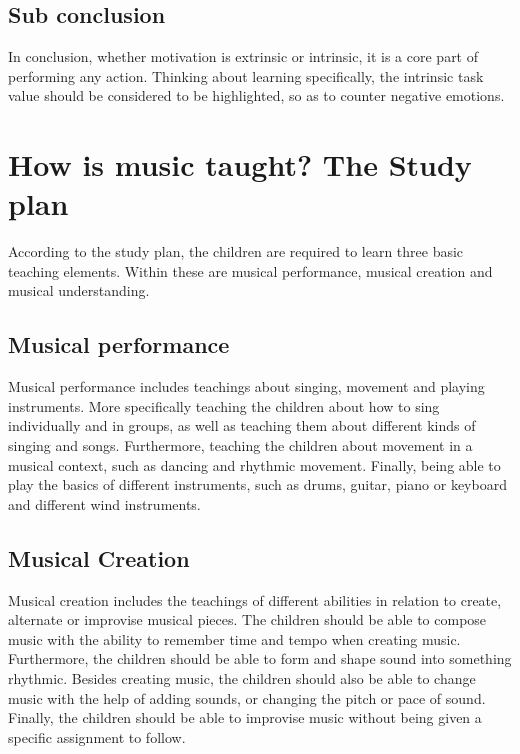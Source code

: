 \subsection*{Sub conclusion}
In conclusion, whether motivation is extrinsic or intrinsic, it is a core part of performing any action. Thinking about learning specifically, the intrinsic task value should be considered to be highlighted, so as to counter negative emotions.

\section{How is music taught? The Study plan}

According to the study plan, the children are required to learn three basic teaching elements. Within these are musical performance, musical creation and musical understanding.

\subsection*{Musical performance}
Musical performance includes teachings about singing, movement and playing instruments. More specifically teaching the children about how to sing individually and in groups, as well as teaching them about different kinds of singing and songs. Furthermore, teaching the children about movement in a musical context, such as dancing and rhythmic movement. Finally, being able to play the basics of different instruments, such as drums, guitar, piano or keyboard and different wind instruments.

\subsection*{Musical Creation}
Musical creation includes the teachings of different abilities in relation to create, alternate or improvise musical pieces. The children should be able to compose music with the ability to remember time and tempo when creating music. Furthermore, the children should be able to form and shape sound into something rhythmic. Besides creating music, the children should also be able to change music with the help of adding sounds, or changing the pitch or pace of sound. Finally, the children should be able to improvise music without being given a specific assignment to follow.

